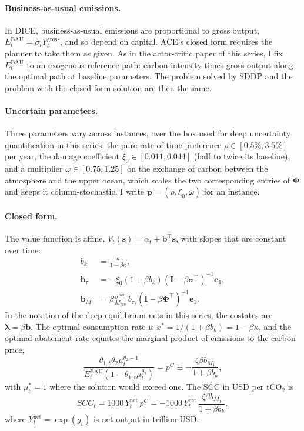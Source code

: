 \paragraph{Business-as-usual emissions.} In DICE, business-as-usual emissions are proportional to gross output, $E^{\text{BAU}}_t = \sigma_t Y^{\text{gross}}_t$, and so depend on capital. ACE's closed form requires the planner to take them as given. As in the actor-critic paper of this series, I fix $E^{\text{BAU}}_t$ to an exogenous reference path: carbon intensity times gross output along the optimal path at baseline parameters. The problem solved by SDDP and the problem with the closed-form solution are then the same.

\paragraph{Uncertain parameters.} Three parameters vary across instances, over the box used for deep uncertainty quantification in this series: the pure rate of time preference $\rho \in [0.5\%, 3.5\%]$ per year, the damage coefficient $\xi_0 \in [0.011, 0.044]$ (half to twice its baseline), and a multiplier $\omega \in [0.75, 1.25]$ on the exchange of carbon between the atmosphere and the upper ocean, which scales the two corresponding entries of $\bm{\Phi}$ and keeps it column-stochastic. I write $\bm{p} = (\rho, \xi_0, \omega)$ for an instance.

\paragraph{Closed form.} The value function is affine, $V_t(\bm{s}) = \alpha_t + \bm{b}^\top \bm{s}$, with slopes that are constant over time:
\begin{align}
    b_k &= \frac{\kappa}{1-\beta\kappa}, \label{eq:bk} \\
    \bm{b}_\tau &= -\xi_0(1+\beta b_k)\left(\bm{I} - \beta\bm{\sigma}^\top\right)^{-1}\bm{e}_1, \label{eq:btau} \\
    \bm{b}_M &= \beta\frac{\sigma^{\text{forc}}}{M_{\text{pre}}}\, b_{\tau_1}\left(\bm{I} - \beta\bm{\Phi}^\top\right)^{-1}\bm{e}_1 . \label{eq:bM}
\end{align}
In the notation of the deep equilibrium nets in this series, the costates are $\bm{\lambda} = \beta\bm{b}$. The optimal consumption rate is $x^* = 1/(1 + \beta b_k) = 1 - \beta\kappa$, and the optimal abatement rate equates the marginal product of emissions to the carbon price,
\begin{equation}
    \frac{\theta_{1,t}\theta_2 \mu_t^{\theta_2 - 1}}{E^{\text{BAU}}_t\left(1 - \theta_{1,t}\mu_t^{\theta_2}\right)} = p^C \equiv -\frac{\zeta \beta b_{M_1}}{1+\beta b_k},
    \label{eq:mu}
\end{equation}
with $\mu^*_t = 1$ where the solution would exceed one. The SCC in USD per tCO$_2$ is
\begin{equation}
    SCC_t = 1000\, Y^{\text{net}}_t\, p^C = -1000\, Y^{\text{net}}_t\, \frac{\zeta \beta b_{M_1}}{1 + \beta b_k},
    \label{eq:scc}
\end{equation}
where $Y^{\text{net}}_t = \exp(g_t)$ is net output in trillion USD.
